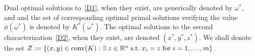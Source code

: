 
Dual optimal solutions to~\eqref{D1}, when they exist, are generically denoted by $\omega^*$, and and the set of corresponding optimal primal solutions verifying the value $\phi(\omega^*)$ is denoted by $K^*(\omega^*)$. The optimal solutions to the second characterization~\eqref{D2}, when they exist, are denoted $(x^*,y^*,z^*)$. We shall denote the set $Z:=\left\{ (x,y) \in \operatorname{conv}(K) : \exists \; z \in \mathbb{R}^n \; \text{s.t.} \; x_i=z\; \text{for }i=1,\dots,m \right \}$. 

